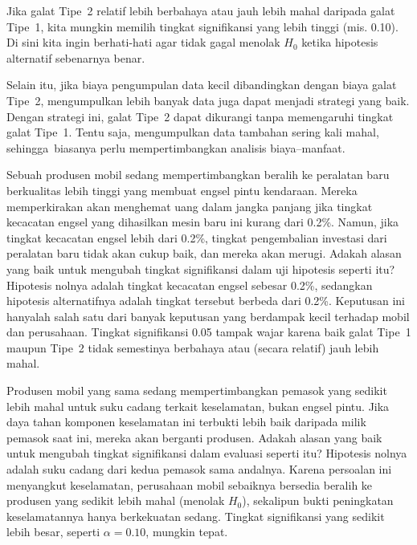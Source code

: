 Jika galat Tipe~2 relatif lebih berbahaya atau jauh lebih
mahal daripada galat Tipe~1, kita mungkin memilih tingkat
signifikansi yang lebih tinggi (mis. 0.10). Di sini kita ingin berhati-hati
agar tidak gagal menolak $H_0$ ketika hipotesis alternatif
sebenarnya benar.

Selain itu, jika biaya pengumpulan data kecil dibandingkan
dengan biaya galat Tipe~2, mengumpulkan lebih banyak data
juga dapat menjadi strategi yang baik.
Dengan strategi ini, galat Tipe~2 dapat dikurangi
tanpa memengaruhi tingkat galat Tipe~1.
Tentu saja, mengumpulkan data tambahan sering kali mahal,
sehingga~biasanya perlu mempertimbangkan analisis biaya--manfaat.

\newcommand{\doorhingeflawrate}{0.2}

\begin{examplewrap}
\begin{nexample}{Sebuah produsen mobil sedang mempertimbangkan beralih
    ke peralatan baru berkualitas lebih tinggi yang membuat
    engsel pintu kendaraan.
    Mereka memperkirakan akan menghemat uang dalam jangka panjang
    jika tingkat kecacatan engsel yang dihasilkan mesin baru ini kurang dari
    \doorhingeflawrate{}\%.
    Namun, jika tingkat kecacatan engsel lebih dari
    \doorhingeflawrate{}\%,
    tingkat pengembalian investasi dari peralatan baru
    tidak akan cukup baik,
    dan mereka akan merugi.
    Adakah alasan yang baik untuk mengubah tingkat signifikansi
    dalam uji hipotesis seperti itu?}
  Hipotesis nolnya adalah tingkat kecacatan
  engsel sebesar \doorhingeflawrate{}\%,
  sedangkan hipotesis alternatifnya adalah tingkat tersebut
  berbeda dari \doorhingeflawrate{}\%.
  Keputusan ini hanyalah salah satu dari banyak keputusan yang berdampak kecil
  terhadap mobil dan perusahaan.
  Tingkat signifikansi 0.05 tampak wajar karena
  baik galat Tipe~1 maupun Tipe~2 tidak semestinya berbahaya
  atau (secara relatif) jauh lebih mahal.
\end{nexample}
\end{examplewrap}

\begin{examplewrap}
\begin{nexample}{Produsen mobil yang sama sedang mempertimbangkan
    pemasok yang sedikit lebih mahal untuk suku cadang terkait
    keselamatan, bukan engsel pintu.
    Jika daya tahan komponen
    keselamatan ini terbukti lebih baik daripada milik
    pemasok saat ini, mereka akan berganti produsen.
    Adakah alasan yang baik untuk mengubah tingkat signifikansi
    dalam evaluasi seperti itu?}
  Hipotesis nolnya adalah suku cadang dari kedua pemasok
  sama andalnya. Karena persoalan ini menyangkut keselamatan,
  perusahaan mobil sebaiknya bersedia beralih ke produsen yang sedikit
  lebih mahal (menolak $H_0$), sekalipun
  bukti peningkatan keselamatannya hanya berkekuatan sedang.
  Tingkat signifikansi yang sedikit lebih besar,
  seperti $\alpha=0.10$, mungkin tepat.
\end{nexample}
\end{examplewrap}

